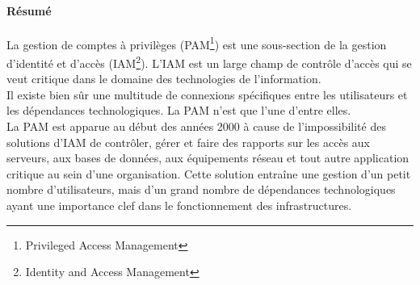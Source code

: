 
\paragraph{Résumé}  La gestion de comptes à privilèges (PAM\footnote{Privileged Access Management}) est une sous-section de la gestion d’identité et d’accès (IAM\footnote{Identity and Access Management}). L’IAM est un large champ de contrôle d’accès qui se veut critique dans le domaine des technologies de l’information.\\
Il existe bien sûr une multitude de connexions spécifiques entre les utilisateurs et les dépendances technologiques. La PAM n’est que l’une d’entre elles.\\
La PAM est apparue au début des années 2000 à cause de l’impossibilité des solutions d’IAM de contrôler, gérer et faire des rapports sur les accès aux serveurs, aux bases de données, aux équipements réseau et tout autre application critique au sein d’une organisation. Cette solution entraîne une gestion d’un petit nombre d’utilisateurs, mais d’un grand nombre de dépendances technologiques ayant une importance clef dans le fonctionnement des infrastructures.